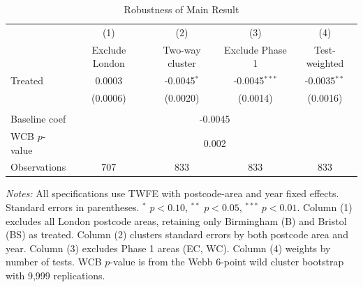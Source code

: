 \begin{table}[H]
\centering
\caption{Robustness of Main Result}
\label{tab:robustness}
\begin{threeparttable}
\begin{tabular}{lcccc}
\toprule
 & (1) & (2) & (3) & (4) \\
 & Exclude London & Two-way cluster & Exclude Phase 1 & Test-weighted \\
\midrule
Treated & 0.0003 & -0.0045$^{*}$ & -0.0045$^{***}$ & -0.0035$^{**}$ \\
 & (0.0006) & (0.0020) & (0.0014) & (0.0016) \\
\\
Baseline coef & \multicolumn{4}{c}{-0.0045} \\
WCB $p$-value & \multicolumn{4}{c}{0.002} \\
Observations & 707 & 833 & 833 & 833 \\
\bottomrule
\end{tabular}
\begin{tablenotes}[flushleft]
\small
\item \textit{Notes:} All specifications use TWFE with postcode-area and year fixed effects. Standard errors in parentheses. $^{*}$ $p<0.10$, $^{**}$ $p<0.05$, $^{***}$ $p<0.01$. Column (1) excludes all London postcode areas, retaining only Birmingham (B) and Bristol (BS) as treated. Column (2) clusters standard errors by both postcode area and year. Column (3) excludes Phase 1 areas (EC, WC). Column (4) weights by number of tests. WCB $p$-value is from the Webb 6-point wild cluster bootstrap with 9,999 replications.
\end{tablenotes}
\end{threeparttable}
\end{table}
